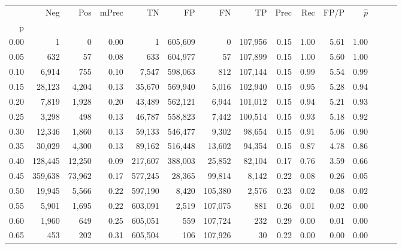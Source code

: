 \begin{tabular}{rrrrrrrrrrrrrrr}
\toprule
{} &      Neg &     Pos & mPrec &       TN &       FP &       FN &       TP &  Prec &   Rec &  FP/P & $\hat{p}$ \\
p    &          &         &       &          &          &          &          &       &       &       &           \\
\midrule
0.00 &        1 &       0 &  0.00 &        1 &  605,609 &        0 &  107,956 &  0.15 &  1.00 &  5.61 &      1.00 \\
0.05 &      632 &      57 &  0.08 &      633 &  604,977 &       57 &  107,899 &  0.15 &  1.00 &  5.60 &      1.00 \\
0.10 &    6,914 &     755 &  0.10 &    7,547 &  598,063 &      812 &  107,144 &  0.15 &  0.99 &  5.54 &      0.99 \\
0.15 &   28,123 &   4,204 &  0.13 &   35,670 &  569,940 &    5,016 &  102,940 &  0.15 &  0.95 &  5.28 &      0.94 \\
0.20 &    7,819 &   1,928 &  0.20 &   43,489 &  562,121 &    6,944 &  101,012 &  0.15 &  0.94 &  5.21 &      0.93 \\
0.25 &    3,298 &     498 &  0.13 &   46,787 &  558,823 &    7,442 &  100,514 &  0.15 &  0.93 &  5.18 &      0.92 \\
0.30 &   12,346 &   1,860 &  0.13 &   59,133 &  546,477 &    9,302 &   98,654 &  0.15 &  0.91 &  5.06 &      0.90 \\
0.35 &   30,029 &   4,300 &  0.13 &   89,162 &  516,448 &   13,602 &   94,354 &  0.15 &  0.87 &  4.78 &      0.86 \\
0.40 &  128,445 &  12,250 &  0.09 &  217,607 &  388,003 &   25,852 &   82,104 &  0.17 &  0.76 &  3.59 &      0.66 \\
0.45 &  359,638 &  73,962 &  0.17 &  577,245 &   28,365 &   99,814 &    8,142 &  0.22 &  0.08 &  0.26 &      0.05 \\
0.50 &   19,945 &   5,566 &  0.22 &  597,190 &    8,420 &  105,380 &    2,576 &  0.23 &  0.02 &  0.08 &      0.02 \\
0.55 &    5,901 &   1,695 &  0.22 &  603,091 &    2,519 &  107,075 &      881 &  0.26 &  0.01 &  0.02 &      0.00 \\
0.60 &    1,960 &     649 &  0.25 &  605,051 &      559 &  107,724 &      232 &  0.29 &  0.00 &  0.01 &      0.00 \\
0.65 &      453 &     202 &  0.31 &  605,504 &      106 &  107,926 &       30 &  0.22 &  0.00 &  0.00 &      0.00 \\

\end{tabular}
